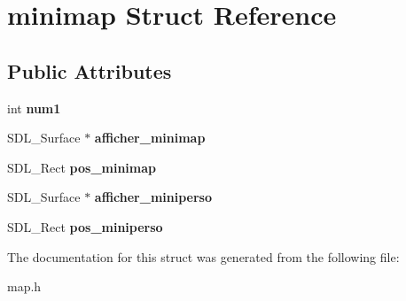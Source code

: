 \hypertarget{structminimap}{}\section{minimap Struct Reference}
\label{structminimap}
\subsection*{Public Attributes}
\begin{DoxyCompactItemize}
\item 
\mbox{\label{structminimap_a1ceccf41b6eec1c28118d94e77945777}} 
int {\bfseries num1}
\item 
\mbox{\label{structminimap_a605b8cc741eda55004e574f06b76a5cf}} 
S\+D\+L\+\_\+\+Surface $\ast$ {\bfseries afficher\+\_\+minimap}
\item 
\mbox{\label{structminimap_af6d54db76eaa41bc62336ffc93fffe78}} 
S\+D\+L\+\_\+\+Rect {\bfseries pos\+\_\+minimap}
\item 
\mbox{\label{structminimap_a1ac802174563ad12a06c9bca1d1794b0}} 
S\+D\+L\+\_\+\+Surface $\ast$ {\bfseries afficher\+\_\+miniperso}
\item 
\mbox{\label{structminimap_ab4469c2e97fa34afe3aa84f1eb553795}} 
S\+D\+L\+\_\+\+Rect {\bfseries pos\+\_\+miniperso}
\end{DoxyCompactItemize}


The documentation for this struct was generated from the following file\+:\begin{DoxyCompactItemize}
\item 
map.\+h\end{DoxyCompactItemize}
